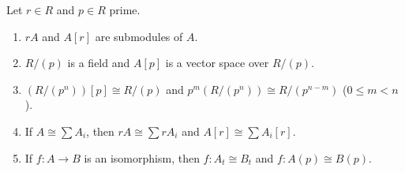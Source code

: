Let $r \in R$ and $p \in R$ prime.
\begin{enumerate}
\item[(i)] $rA$ and $A[r]$ are submodules of $A$.
\item[(ii)] $R/(p)$ is a field and $A[p]$ is a vector space over $R/(p)$.
\item[(iii)] $(R/(p^n))[p] \cong R/(p)$ and $p^m(R/(p^n)) \cong R/(p^{n-m})$ ($0 \leq m < n$).
\item[(iv)] If $A \cong \sum A_i$, then $rA \cong \sum rA_i$ and $A[r] \cong \sum A_i[r]$.
\item[(v)] If $f: A \to B$ is an isomorphism, then $f: A_t \cong B_t$ and $f: A(p) \cong B(p)$.
\end{enumerate}
